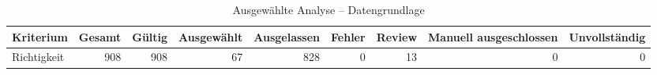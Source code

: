 \begin{table}[htbp]
\centering
\caption{Ausgewählte Analyse -- Datengrundlage}
\begin{tabular}{lrrrrrrrr}
\toprule
Kriterium & Gesamt & Gültig & Ausgewählt & Ausgelassen & Fehler & Review & Manuell ausgeschlossen & Unvollständig \\
\midrule
Richtigkeit & 908 & 908 & 67 & 828 & 0 & 13 & 0 & 0 \\
\bottomrule
\end{tabular}
\end{table}

